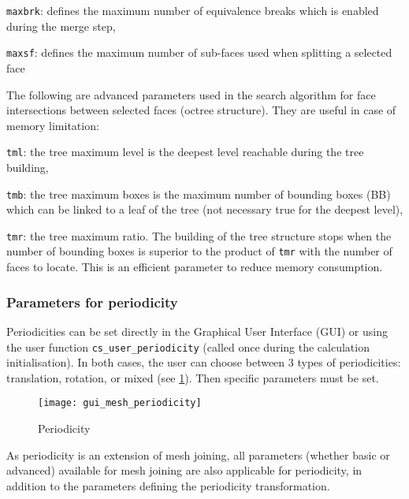 {{{\begin{list}{-}{}
\item \texttt{maxbrk}: defines the maximum number of equivalence breaks which is enabled during the merge step,
\item \texttt{maxsf}: defines the maximum number of sub-faces used when splitting a selected face
\end{list}
%
The following are advanced parameters used in the search algorithm for face intersections between selected faces (octree structure). They are useful in case of memory limitation:
\begin{list}{-}{}
\item \texttt{tml}: the tree maximum level is the deepest level reachable during the tree building,
\item \texttt{tmb}: the tree maximum boxes is the maximum number of bounding boxes (BB) which can be linked to a leaf of the tree (not necessary true for the deepest level),
\item \texttt{tmr}: the tree maximum ratio. The building of the tree structure stops when the number of bounding boxes is superior to the product of \texttt{tmr} with the number of faces to locate. This is an efficient parameter to reduce memory consumption.
\end{list}

\subsubsection{Parameters for periodicity}

Periodicities can be set directly in the Graphical User Interface (GUI) or using the user function \texttt{cs\_user\_periodicity} (called once during the calculation initialisation). In both cases, the user can choose between 3 types of periodicities: translation, rotation, or mixed
(see \figurename\ref{fig:periodicities}).
Then specific parameters must be set.

\begin{figure}[!h]
\begin{center}
\texttt{[image: gui\_mesh\_periodicity]}
\caption{Periodicity}
\label{fig:periodicities}
\end{center}
\end{figure}

As periodicity is an extension of mesh joining, all parameters (whether basic or advanced) available for mesh joining are also applicable for periodicity, in addition to the parameters defining the periodicity transformation.

}}}
